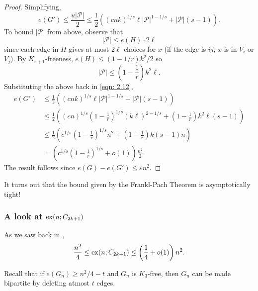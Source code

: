 \begin{proof}
				Simplifying,
					\begin{equation}
						\label{eqn: 2.12}
						e(G') \le \frac{u|\mathcal{P}|}{2} \le \frac{1}{2} \left((cn k)^{1/s} \ell | \mathcal{P} |^{1 - 1/s}  + |\mathcal{P}| (s-1)\right).
					\end{equation}
				To bound $|\mathcal{P}|$ from above, observe that
					\[ |\mathcal{P}| \le e(H) \cdot 2 \ell \]
				since each edge in $H$ gives at most $2\ell$ choices for $x$ (if the edge is $ij$, $x$ is in $V_i$ or $V_j$). By $K_{r+1}$-freeness, $e(H) \le (1 - 1/r) k^2/2$ so
					\[ |\mathcal{P}| \le \left( 1 - \frac{1}{r} \right) k^2 \ell. \]
				Substituting the above back in \eqref{eqn: 2.12},
					\begin{align*}
						e(G') &\le \frac{1}{2} \left((cn k)^{1/s} \ell | \mathcal{P} |^{1 - 1/s}  + |\mathcal{P}| (s-1)\right) \\
							&\le \frac{1}{2} \left( (cn)^{1/s} \left( 1 - \frac{1}{r} \right)^{1/s} (k\ell)^{2-1/s} + \left( 1 - \frac{1}{r} \right) k^2\ell (s-1) \right) \\
							&\le \frac{1}{2} \left( c^{1/s} \left( 1 - \frac{1}{r} \right)^{1/s} n^2 + \left( 1 - \frac{1}{r} \right) k (s-1) n \right) \\
							&= \left( c^{1/s} \left( 1 - \frac{1}{r} \right)^{1/s} + o(1) \right) \frac{n^2}{2}.
					\end{align*}
				The result follows since $e(G) - e(G') \le \varepsilon n^2$.
			\end{proof}

			It turns out that the bound given by the Frankl-Pach Theorem is asymptotically tight!

		\subsubsection{A look at \texorpdfstring{$\operatorname{ex}(n;C_{2k+1})$}{ex(n;C 2k+1)}}

			As we saw back in ,
			\[ \frac{n^2}{4} \le \operatorname{ex}(n;C_{2k+1}) \le \left( \frac{1}{4} + o(1) \right) n^2. \]

			Recall that if $e(G_n) \ge n^2/4 - t$ and $G_n$ is $K_3$-free, then $G_n$ can be made bipartite by deleting atmost $t$ edges.

